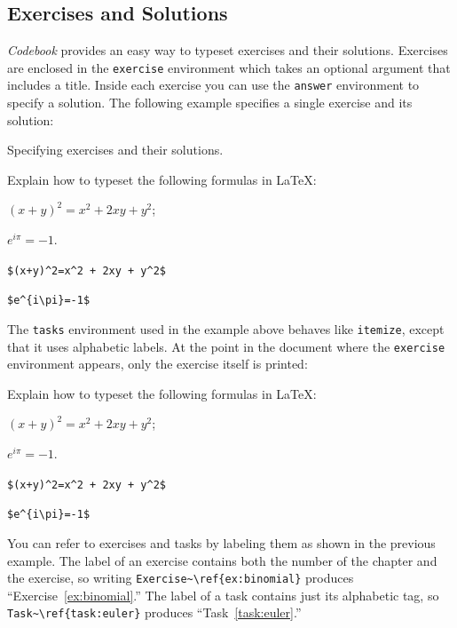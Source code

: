 \documentclass[minted]{codebook}
\begin{document}
\subsection{Exercises and Solutions}

\emph{Codebook} provides an easy way to typeset exercises and their solutions.
Exercises are enclosed in the \verb|exercise| environment which takes an optional argument that includes a title.
Inside each exercise you can use the \verb|answer| environment to specify a solution.
The following example specifies a single exercise and its solution:
\begin{lst*}{Specifying exercises and their solutions.}
\begin{texcode}
\begin{exercise}
\label{ex:binomial}
Explain how to typeset the following formulas in \LaTeX{}:
\begin{tasks}
  \item $(x+y)^2=x^2 + 2xy + y^2$;
  \item $e^{i\pi}=-1$.
\end{tasks}

\begin{answer}
\begin{tasks}
  \item \verb|$(x+y)^2=x^2 + 2xy + y^2$|
  \item \verb|$e^{i\pi}=-1$|
\end{tasks}
\end{answer}
\end{exercise}
\end{texcode}
\end{lst*}
The \texttt{tasks} environment used in the example above behaves like \verb|itemize|, except that it uses alphabetic labels.
At the point in the document where the \verb|exercise| environment appears, only the exercise itself is printed:
\begin{exercise}
\label{ex:binomial}
Explain how to typeset the following formulas in \LaTeX{}:
\begin{tasks}
  \item $(x+y)^2=x^2 + 2xy + y^2$;
  \item \label{task:euler} $e^{i\pi}=-1$.
\end{tasks}

\begin{answer}
\begin{tasks}
  \item \verb|$(x+y)^2=x^2 + 2xy + y^2$|
  \item \verb|$e^{i\pi}=-1$|
\end{tasks}
\end{answer}
\end{exercise}
You can refer to exercises and tasks by labeling them as shown in the previous example. 
The label of an exercise contains both the number of the chapter and the exercise, so writing \verb|Exercise~\ref{ex:binomial}| produces ``Exercise~\ref{ex:binomial}.'' 
The label of a task contains just its alphabetic tag, so \verb|Task~\ref{task:euler}| produces ``Task~\ref{task:euler}.''
\end{document}
